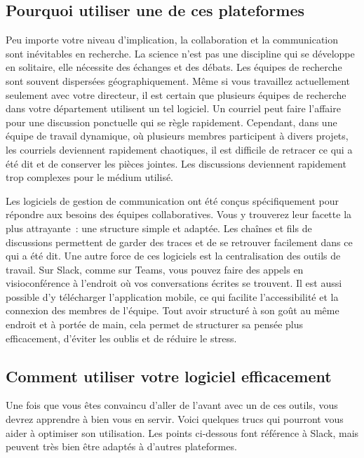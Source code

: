 \documentclass[
  letterpaper,
]{scrbook}
\begin{document}
\hypertarget{pourquoi-utiliser-une-de-ces-plateformes}{%
\subsection{Pourquoi utiliser une de ces
plateformes}\label{pourquoi-utiliser-une-de-ces-plateformes}}

Peu importe votre niveau d'implication, la collaboration et la
communication sont inévitables en recherche. La science n'est pas une
discipline qui se développe en solitaire, elle nécessite des échanges et
des débats. Les équipes de recherche sont souvent dispersées
géographiquement. Même si vous travaillez actuellement seulement avec
votre directeur, il est certain que plusieurs équipes de recherche dans
votre département utilisent un tel logiciel. Un courriel peut faire
l'affaire pour une discussion ponctuelle qui se règle rapidement.
Cependant, dans une équipe de travail dynamique, où plusieurs membres
participent à divers projets, les courriels deviennent rapidement
chaotiques, il est difficile de retracer ce qui a été dit et de
conserver les pièces jointes. Les discussions deviennent rapidement trop
complexes pour le médium utilisé.

Les logiciels de gestion de communication ont été conçus spécifiquement
pour répondre aux besoins des équipes collaboratives. Vous y trouverez
leur facette la plus attrayante~: une structure simple et adaptée. Les
chaînes et fils de discussions permettent de garder des traces et de se
retrouver facilement dans ce qui a été dit. Une autre force de ces
logiciels est la centralisation des outils de travail. Sur Slack, comme
sur Teams, vous pouvez faire des appels en visioconférence à l'endroit
où vos conversations écrites se trouvent. Il est aussi possible d'y
télécharger l'application mobile, ce qui facilite l'accessibilité et la
connexion des membres de l'équipe. Tout avoir structuré à son goût au
même endroit et à portée de main, cela permet de structurer sa pensée
plus efficacement, d'éviter les oublis et de réduire le stress.

\hypertarget{comment-utiliser-votre-logiciel-efficacement}{%
\subsection{Comment utiliser votre logiciel
efficacement}\label{comment-utiliser-votre-logiciel-efficacement}}

Une fois que vous êtes convaincu d'aller de l'avant avec un de ces
outils, vous devrez apprendre à bien vous en servir. Voici quelques
trucs qui pourront vous aider à optimiser son utilisation. Les points
ci-dessous font référence à Slack, mais peuvent très bien être adaptés à
d'autres plateformes.
\end{document}
